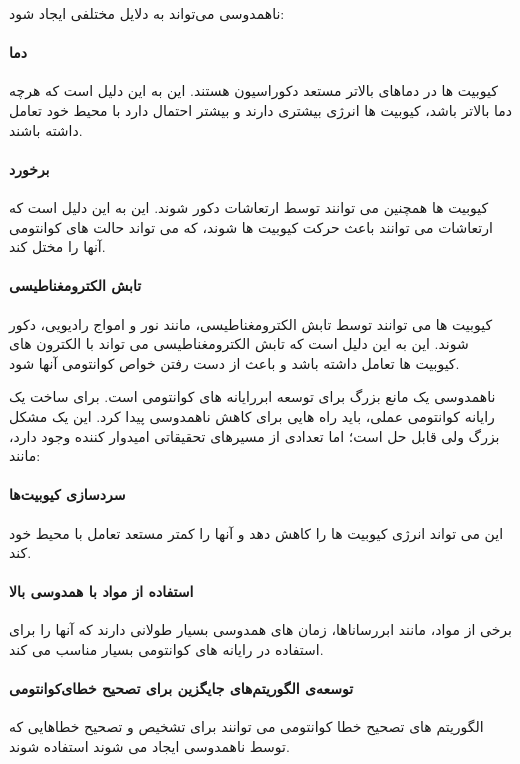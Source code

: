 \documentclass{book}
\begin{document}
ناهمدوسی می‌تواند به دلایل مختلفی ایجاد شود:

\paragraph{دما}کیوبیت ها در دماهای بالاتر مستعد دکوراسیون هستند. این به این دلیل است که هرچه دما بالاتر باشد، کیوبیت ها انرژی بیشتری دارند و بیشتر احتمال دارد با محیط خود تعامل داشته باشند.

\paragraph{برخورد}کیوبیت ها همچنین می توانند توسط ارتعاشات دکور شوند. این به این دلیل است که ارتعاشات می توانند باعث حرکت کیوبیت ها شوند، که می تواند حالت های کوانتومی آنها را مختل کند.

\paragraph{تابش الکترومغناطیسی}کیوبیت ها می توانند توسط تابش الکترومغناطیسی، مانند نور و امواج رادیویی، دکور شوند. این به این دلیل است که تابش الکترومغناطیسی می تواند با الکترون های کیوبیت ها تعامل داشته باشد و باعث از دست رفتن خواص کوانتومی آنها شود.

ناهمدوسی یک مانع بزرگ برای توسعه ابررایانه های کوانتومی است. برای ساخت یک رایانه کوانتومی عملی، باید راه هایی برای کاهش ناهمدوسی پیدا کرد. این یک مشکل بزرگ ولی قابل حل است؛ اما تعدادی از مسیرهای تحقیقاتی امیدوار کننده وجود دارد، مانند:

\paragraph{سردسازی کیوبیت‌ها} این می تواند انرژی کیوبیت ها را کاهش دهد و آنها را کمتر مستعد تعامل با محیط خود کند.

\paragraph{استفاده از مواد با همدوسی بالا}برخی از مواد، مانند ابررساناها، زمان های همدوسی بسیار طولانی دارند که آنها را برای استفاده در رایانه های کوانتومی بسیار مناسب می کند.

\paragraph{توسعه‌ی الگوریتم‌های جایگزین برای تصحیح خطای‌‌کوانتومی}
الگوریتم های تصحیح خطا کوانتومی می توانند برای تشخیص و تصحیح خطاهایی که توسط ناهمدوسی ایجاد می شوند استفاده شوند.
\end{document}
